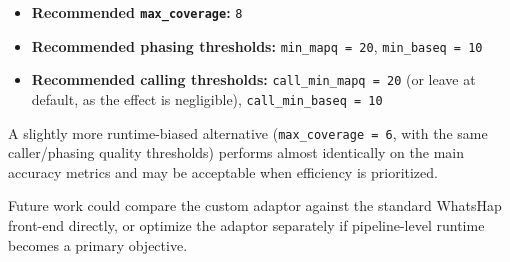\documentclass[
]{article}
\providecommand{\tightlist}{%
  \setlength{\itemsep}{0pt}\setlength{\parskip}{0pt}}
\begin{document}
\begin{itemize}
\tightlist
\item
  \textbf{Recommended \texttt{max\_coverage}:} \texttt{8}\\
\item
  \textbf{Recommended phasing thresholds:} \texttt{min\_mapq\ =\ 20},
  \texttt{min\_baseq\ =\ 10}\\
\item
  \textbf{Recommended calling thresholds:}
  \texttt{call\_min\_mapq\ =\ 20} (or leave at default, as the effect is
  negligible), \texttt{call\_min\_baseq\ =\ 10}
\end{itemize}

A slightly more runtime-biased alternative
(\texttt{max\_coverage\ =\ 6}, with the same caller/phasing quality
thresholds) performs almost identically on the main accuracy metrics and
may be acceptable when efficiency is prioritized.

Future work could compare the custom adaptor against the standard
WhatsHap front-end directly, or optimize the adaptor separately if
pipeline-level runtime becomes a primary objective.
\end{document}
